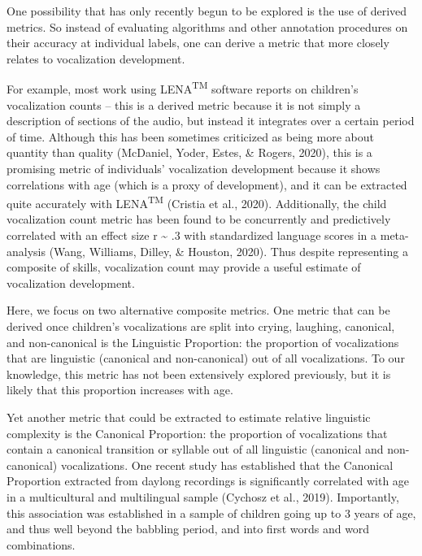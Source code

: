 \documentclass[english,,man]{apa6}
\begin{document}
One possibility that has only recently begun to be explored is the use of derived metrics. So instead of evaluating algorithms and other annotation procedures on their accuracy at individual labels, one can derive a metric that more closely relates to vocalization development.

For example, most work using LENA\textsuperscript{TM} software reports on children's vocalization counts -- this is a derived metric because it is not simply a description of sections of the audio, but instead it integrates over a certain period of time. Although this has been sometimes criticized as being more about quantity than quality (McDaniel, Yoder, Estes, \& Rogers, 2020), this is a promising metric of individuals' vocalization development because it shows correlations with age (which is a proxy of development), and it can be extracted quite accurately with LENA\textsuperscript{TM} (Cristia et al., 2020). Additionally, the child vocalization count metric has been found to be concurrently and predictively correlated with an effect size r \textasciitilde{} .3 with standardized language scores in a meta-analysis (Wang, Williams, Dilley, \& Houston, 2020). Thus despite representing a composite of skills, vocalization count may provide a useful estimate of vocalization development.

Here, we focus on two alternative composite metrics. One metric that can be derived once children's vocalizations are split into crying, laughing, canonical, and non-canonical is the Linguistic Proportion: the proportion of vocalizations that are linguistic (canonical and non-canonical) out of all vocalizations. To our knowledge, this metric has not been extensively explored previously, but it is likely that this proportion increases with age.

Yet another metric that could be extracted to estimate relative linguistic complexity is the Canonical Proportion: the proportion of vocalizations that contain a canonical transition or syllable out of all linguistic (canonical and non-canonical) vocalizations. One recent study has established that the Canonical Proportion extracted from daylong recordings is significantly correlated with age in a multicultural and multilingual sample (Cychosz et al., 2019). Importantly, this association was established in a sample of children going up to 3 years of age, and thus well beyond the babbling period, and into first words and word combinations.
\end{document}
